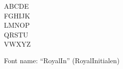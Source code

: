 \documentclass[a4paper]{article}
\begin{document}
\begin{center}
\fontsize{60pt}{72pt}
  ABCDE \\
  FGHIJK \\
  LMNOP \\
  QRSTU \\
  VWXYZ \\
\end{center}
\vfill
\begin{center}
Font name: ``RoyalIn'' (RoyalInitialen)
\end{center}
\end{document}
